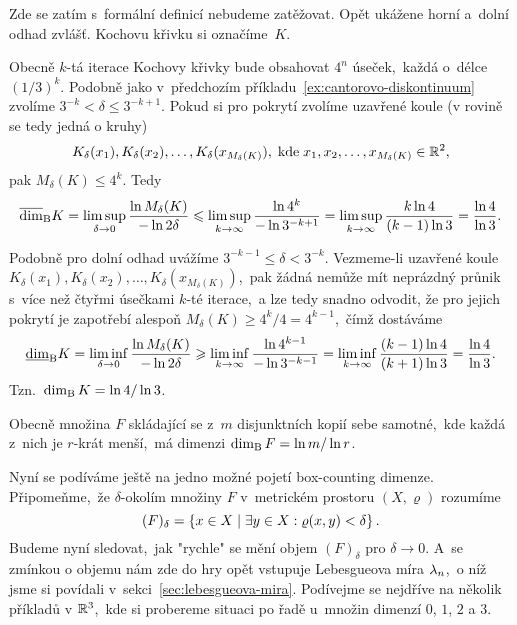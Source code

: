 \begin{example}\label{ex:kochova-krivka}
    Zde se zatím s~formální definicí nebudeme zatěžovat. Opět ukážene horní a~dolní odhad zvlášť. Kochovu křivku si označíme~$K$.

    Obecně $k$-tá iterace Kochovy křivky bude obsahovat $4^n$ úseček,~každá o~délce $(1/3)^k$. Podobně jako v~předchozím příkladu~\ref{ex:cantorovo-diskontinuum} zvolíme $3^{-k}<\delta\leqslant 3^{-k+1}$. Pokud si pro pokrytí zvolíme uzavřené koule (v rovině se tedy jedná o kruhy)
    \[K_\delta(x_1),K_\delta(x_2),\ldots,K_\delta(x_{M_\delta(K)}),\;\text{kde}\;x_1,x_2,\ldots,x_{M_\delta(K)}\in\mathbb{R}^2,\]
    pak $M_\delta(K)\leqslant 4^k$. Tedy
    \[\overline{\dim}_\textup{B}{K}=\limsup_{\delta\to 0}\dfrac{\ln{M_\delta(K)}}{-\ln{2\delta}}\leqslant\limsup_{k\to\infty}\dfrac{\ln{4^k}}{-\ln{3^{-k+1}}}=\limsup_{k\to\infty}\dfrac{k\ln{4}}{(k-1)\ln{3}}=\dfrac{\ln{4}}{\ln{3}}.\]

    Podobně pro dolní odhad uvážíme $3^{-k-1}\leqslant\delta<3^{-k}$. Vezmeme-li uzavřené koule $K_\delta(x_1),K_\delta(x_2),\ldots,K_\delta(x_{M_\delta(K)})$,~pak žádná nemůže mít neprázdný průnik s~více než čtyřmi úsečkami $k$-té iterace,~a lze tedy snadno odvodit, že pro jejich pokrytí je zapotřebí alespoň $M_\delta(K)\geqslant 4^k/4=4^{k-1}$,~čímž dostáváme
    \[\underline{\dim}_\textup{B}{K}=\liminf_{\delta\to 0}\dfrac{\ln{M_\delta(K)}}{-\ln{2\delta}}\geqslant\liminf_{k\to\infty}\dfrac{\ln{4^{k-1}}}{-\ln{3^{-k-1}}}=\liminf_{k\to\infty}\dfrac{(k-1)\ln{4}}{(k+1)\ln{3}}=\dfrac{\ln{4}}{\ln{3}}.\]
    Tzn.~$\operatorname{dim_B}{K}=\ln{4}/\ln{3}$.
\end{example}
\begin{remark}
    Obecně množina $F$ skládající se z~$m$ disjunktních kopií sebe samotné,~kde každá z~nich je $r$-krát menší,~má dimenzi $\operatorname{dim_B}{F}=\ln{m}/\ln{r}$. \cite{Falconer1989}
\end{remark}
Nyní se podíváme ještě na jedno možné pojetí box-counting dimenze. Připomeňme,~že $\delta$-okolím množiny $F$ v~metrickém prostoru $(X,\varrho)$ rozumíme
\[(F)_\delta=\left\{x\in X\mid\exists y\in X: \varrho(x,y)<\delta\right\}.\]
Budeme nyní sledovat,~jak "rychle" se mění objem $(F)_\delta$ pro $\delta\to 0$. A~se zmínkou o objemu nám zde do hry opět vstupuje Lebesgueova míra $\lambda_n$,~o níž jsme si povídali v~sekci~\ref{sec:lebesgueova-mira}. Podívejme se nejdříve na několik příkladů v $\mathbb{R}^3$,~kde si probereme situaci po řadě u~množin dimenzí $0$, $1$, $2$ a $3$.
